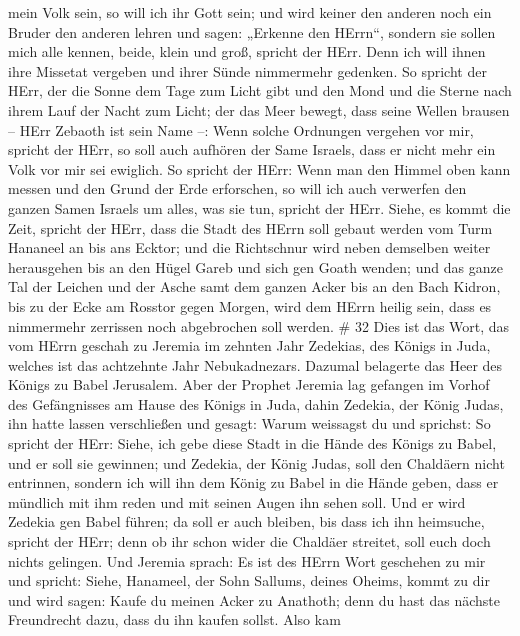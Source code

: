 mein Volk sein, so will ich ihr Gott sein;  und wird keiner
den anderen noch ein Bruder den anderen lehren und sagen: „Erkenne den
HErrn``, sondern sie sollen mich alle kennen, beide, klein und groß,
spricht der HErr. Denn ich will ihnen ihre Missetat vergeben und ihrer
Sünde nimmermehr gedenken.  So spricht der HErr, der die
Sonne dem Tage zum Licht gibt und den Mond und die Sterne nach ihrem
Lauf der Nacht zum Licht; der das Meer bewegt, dass seine Wellen brausen
-- HErr Zebaoth ist sein Name --:  Wenn solche Ordnungen
vergehen vor mir, spricht der HErr, so soll auch aufhören der Same
Israels, dass er nicht mehr ein Volk vor mir sei ewiglich. 
So spricht der HErr: Wenn man den Himmel oben kann messen und den Grund
der Erde erforschen, so will ich auch verwerfen den ganzen Samen Israels
um alles, was sie tun, spricht der HErr.  Siehe, es kommt
die Zeit, spricht der HErr, dass die Stadt des HErrn soll gebaut werden
vom Turm Hananeel an bis ans Ecktor;  und die Richtschnur
wird neben demselben weiter herausgehen bis an den Hügel Gareb und sich
gen Goath wenden;  und das ganze Tal der Leichen und der
Asche samt dem ganzen Acker bis an den Bach Kidron, bis zu der Ecke am
Rosstor gegen Morgen, wird dem HErrn heilig sein, dass es nimmermehr
zerrissen noch abgebrochen soll werden. \# 32  Dies ist das
Wort, das vom HErrn geschah zu Jeremia im zehnten Jahr Zedekias, des
Königs in Juda, welches ist das achtzehnte Jahr Nebukadnezars.
 Dazumal belagerte das Heer des Königs zu Babel Jerusalem.
Aber der Prophet Jeremia lag gefangen im Vorhof des Gefängnisses am
Hause des Königs in Juda,  dahin Zedekia, der König Judas,
ihn hatte lassen verschließen und gesagt: Warum weissagst du und
sprichst: So spricht der HErr: Siehe, ich gebe diese Stadt in die Hände
des Königs zu Babel, und er soll sie gewinnen;  und Zedekia,
der König Judas, soll den Chaldäern nicht entrinnen, sondern ich will
ihn dem König zu Babel in die Hände geben, dass er mündlich mit ihm
reden und mit seinen Augen ihn sehen soll.  Und er wird
Zedekia gen Babel führen; da soll er auch bleiben, bis dass ich ihn
heimsuche, spricht der HErr; denn ob ihr schon wider die Chaldäer
streitet, soll euch doch nichts gelingen.  Und Jeremia
sprach: Es ist des HErrn Wort geschehen zu mir und spricht: 
Siehe, Hanameel, der Sohn Sallums, deines Oheims, kommt zu dir und wird
sagen: Kaufe du meinen Acker zu Anathoth; denn du hast das nächste
Freundrecht dazu, dass du ihn kaufen sollst.  Also kam

